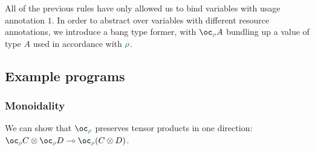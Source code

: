 
All of the previous rules have only allowed us to bind variables with usage
annotation $1$.
In order to abstract over variables with different resource annotations, we
introduce a bang type former, with $\excl{\rho}{A}$ bundling up a value of type
$A$ used in accordance with $\rescomment \rho$.


\subsection{Example programs}

\subsubsection{Monoidality}
We can show that $\excl{\rho}{}$ preserves tensor products in one direction:
$\fun{\tensor{\excl{\rho}{C}}{\excl{\rho}{D}}}{\excl{\rho}{(\tensor{C}{D})}}$.


